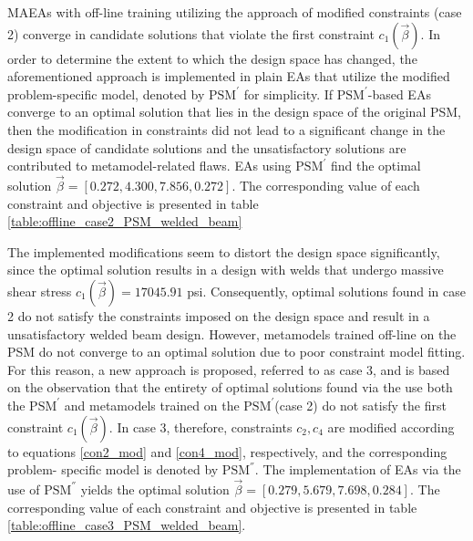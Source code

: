 MAEAs with off-line training utilizing the approach of modified 
constraints (case 2) converge in candidate solutions that 
violate the first constraint $c_{1}(\vec{β})$. In order to 
determine the extent to which the design space has changed, the 
aforementioned approach is implemented in plain EAs that 
utilize the modified problem-specific model, denoted by 
$\mathrm{PSM}^{'}$ for simplicity. If $\mathrm{PSM}^{'}$-based 
EAs converge to an optimal solution that lies in the design 
space of the original PSM, then the modification in 
constraints did not lead to a significant change in the design 
space of candidate solutions and the unsatisfactory solutions 
are contributed to metamodel-related flaws. EAs using 
$\mathrm{PSM}^{'}$ find the optimal solution $\vec{β} = 
[0.272, 4.300, 7.856, 0.272]$. The corresponding value of each 
constraint and objective is presented in table 
\ref{table:offline_case2_PSM_welded_beam}

\begin{table}[h!]
\centering
\caption{\textbf{C}, \textbf{F} responses to $\vec{β}$ found 
via EAs using the $\mathrm{PSM}^{'}$}
\label{table:offline_case2_PSM_welded_beam}
\end{table}

The implemented modifications seem to distort the design space
significantly, since the optimal solution results in a design 
with welds that undergo massive shear stress $c_{1}(\vec{β}) = 
17045.91$ psi. Consequently, optimal solutions found in 
case 2 do not satisfy the constraints imposed on the design 
space and result in a unsatisfactory welded beam design. 
However, metamodels trained off-line on the PSM do not 
converge to an optimal solution due to poor constraint model 
fitting. For this reason, a new approach is proposed, 
referred to as case 3, and is based on the observation that 
the entirety of optimal solutions found via the use both the 
$\mathrm{PSM}^{'}$ and metamodels trained on the $\mathrm{PSM}
^{'}$(case 2) do not satisfy the first constraint $c_{1}
(\vec{β})$. In case 3, therefore, constraints $c_{2}, c_{4}$ 
are modified according to equations \ref{con2_mod} and 
\ref{con4_mod}, respectively, and the corresponding problem-
specific model is denoted by $\mathrm{PSM}^{''}$. The 
implementation of EAs via the use of $\mathrm{PSM}^{''}$ 
yields the optimal solution $\vec{β} \!= \![0.279, 5.679, 7.698, 
0.284]$. The corresponding value of each constraint and objective 
is presented in table \ref{table:offline_case3_PSM_welded_beam}.

